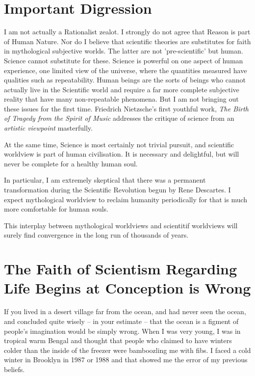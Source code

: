 \documentclass{amsart}
\begin{document}
\section{Important Digression}

I am not actually a Rationalist zealot.  I strongly do not agree that Reason is part of Human Nature.  Nor do I believe that scientific theories are substitutes for  faith in mythological subjective worlds.  The latter are not 'pre-scientific' but human.  Science cannot substitute for these.  Science is powerful on one aspect of human experience, one limited view of the universe, where the quantities measured have qualities such as repeatability.  Human beings are the sorts of beings who cannot actually live in the Scientific world and require a far more complete subjective reality that have many non-repeatable phenomena.  But I am not bringing out these issues for the first time.  Friedrich Nietzsche's first youthful work, {\em The Birth of Tragedy from the Spirit of Music} addresses the critique of science from an {\em artistic viewpoint} masterfully.  

At the same time, Science is most certainly not trivial pursuit, and scientific worldview is part of human civilisation.  It is necessary and delightful, but will never be complete for a healthy human soul.

In particular, I am extremely skeptical that there was a permanent transformation during the Scientific Revolution begun by Rene Descartes.  I expect mythological worldview to reclaim humanity periodically for that is much more comfortable for human souls.  

This interplay between mythological worldviews and scientitif worldviews will surely find convergence in the long run of thousands of years.


\section{The Faith of Scientism Regarding Life Begins at Conception is Wrong}

If you lived in a desert village far from the ocean, and had never seen the ocean, and concluded quite wisely -- in your estimate -- that the ocean is a figment of people's imagination would be simply wrong.  When I was very young, I was in tropical warm Bengal and thought that people who claimed to have winters colder than the inside of the freezer were bamboozling me with fibs.  I faced a cold winter in Brooklyn in 1987 or 1988 and that showed me the error of my previous beliefs.  
\end{document}
